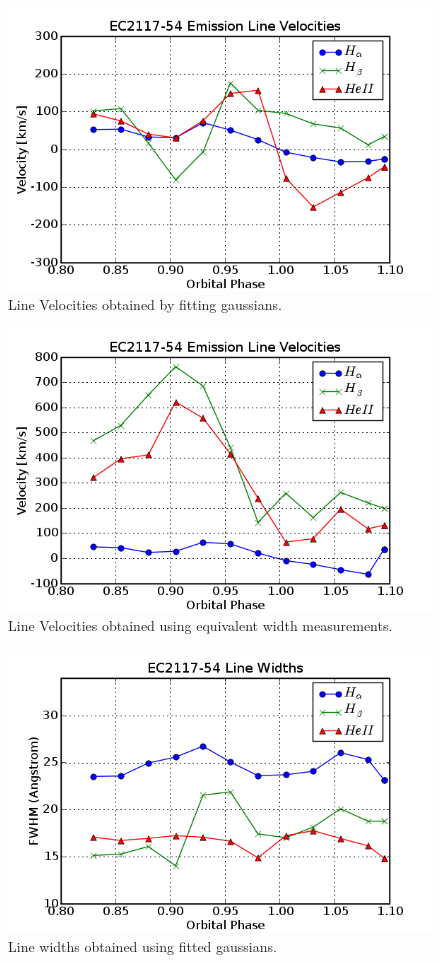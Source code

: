\begin{figure}
 \centering
 \includegraphics[width = 0.8\columnwidth, bb=0 0 600 400]{images/vel_gauss.png}
 \caption{Line Velocities obtained by fitting gaussians.}
 \label{vel_gauss}
\end{figure}


\begin{figure}
 \centering
 \includegraphics[width = 0.8\columnwidth, bb=0 0 600 400]{images/vel_ew.png}
 \caption{Line Velocities obtained using equivalent width measurements.}
 \label{vel_ew}
\end{figure}


\begin{figure}
 \centering
 \includegraphics[width = 0.8\columnwidth, bb=0 0 600 400]{images/lw_gauss.png}
 \caption{Line widths obtained using fitted gaussians.}
 \label{lw_gauss}
\end{figure}


